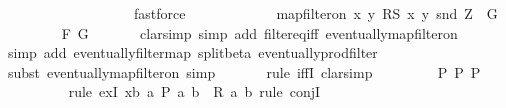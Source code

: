 \begin{isabellebody}
\ \ \ \ \ \ \ \ \isamarkupfalse%
\isanewline
\ \ \ \ \ \ \isamarkupfalse%
\ \isamarkupfalse%
\ fastforce\isanewline
\ \ \ \ \ \ \isamarkupfalse%
\isanewline
\ \ \ \ \isamarkupfalse%
\ {\isachardoublequoteopen}map{\isacharunderscore}{\kern0pt}filter{\isacharunderscore}{\kern0pt}on\ {\isacharbraceleft}{\kern0pt}{\isacharparenleft}{\kern0pt}x{\isacharcomma}{\kern0pt}\ y{\isacharparenright}{\kern0pt}{\isachardot}{\kern0pt}\ {\isacharquery}{\kern0pt}RS\ x\ y{\isacharbraceright}{\kern0pt}\ snd\ {\isacharquery}{\kern0pt}Z\ {\isacharequal}{\kern0pt}\ {\isacharquery}{\kern0pt}G{\isachardoublequoteclose}\isanewline
\ \ \ \ \ \ \isamarkupfalse%
\ F\ G\isanewline
\ \ \ \ \ \ \isamarkupfalse%
{\isacharparenleft}{\kern0pt}clarsimp\ simp\ add{\isacharcolon}{\kern0pt}\ filter{\isacharunderscore}{\kern0pt}eq{\isacharunderscore}{\kern0pt}iff\ eventually{\isacharunderscore}{\kern0pt}map{\isacharunderscore}{\kern0pt}filter{\isacharunderscore}{\kern0pt}on\ {\isacharasterisk}{\kern0pt}{\isacharparenright}{\kern0pt}\isanewline
\ \ \ \ \ \ \isamarkupfalse%
{\isacharparenleft}{\kern0pt}simp\ add{\isacharcolon}{\kern0pt}\ eventually{\isacharunderscore}{\kern0pt}filtermap\ split{\isacharunderscore}{\kern0pt}beta\ eventually{\isacharunderscore}{\kern0pt}prod{\isacharunderscore}{\kern0pt}filter{\isacharparenright}{\kern0pt}\isanewline
\ \ \ \ \ \ \isamarkupfalse%
{\isacharparenleft}{\kern0pt}subst\ eventually{\isacharunderscore}{\kern0pt}map{\isacharunderscore}{\kern0pt}filter{\isacharunderscore}{\kern0pt}on{\isacharsemicolon}{\kern0pt}\ simp{\isacharparenright}{\kern0pt}{\isacharplus}{\kern0pt}\isanewline
\ \ \ \ \ \ \isamarkupfalse%
{\isacharparenleft}{\kern0pt}rule\ iffI{\isacharsemicolon}{\kern0pt}\ clarsimp{\isacharparenright}{\kern0pt}\isanewline
\ \ \ \ \ \ \isamarkupfalse%
\ \ P\ P{\isacharprime}{\kern0pt}\ P{\isacharprime}{\kern0pt}{\isacharprime}{\kern0pt}\isanewline
\ \ \ \ \ \ \ \ \isamarkupfalse%
{\isacharparenleft}{\kern0pt}rule\ exI{\isacharbrackleft}{\kern0pt}\ x{\isacharequal}{\kern0pt}{\isachardoublequoteopen}{\isasymlambda}b{\isachardot}{\kern0pt}\ {\isasymexists}a{\isachardot}{\kern0pt}\ P{\isacharprime}{\kern0pt}\ {\isacharparenleft}{\kern0pt}a{\isacharcomma}{\kern0pt}\ b{\isacharparenright}{\kern0pt}\ {\isasymand}\ R\ a\ b{\isachardoublequoteclose}{\isacharbrackright}{\kern0pt}{\isacharsemicolon}{\kern0pt}\ rule\ conjI{\isacharparenright}{\kern0pt}\isanewline

\end{isabellebody}
